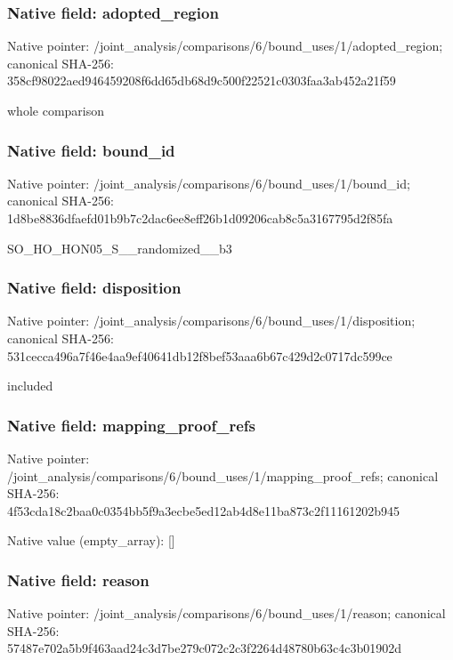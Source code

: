 \documentclass[10pt,a4paper]{article}
\begin{document}
\subsubsection{Native field: adopted\_\allowbreak{}region}
Native pointer: /joint\_\allowbreak{}analysis/comparisons/6/bound\_\allowbreak{}uses/1/adopted\_\allowbreak{}region; canonical SHA-256: 358cf98022aed946459208f6dd65db68d9c500f22521c0303faa3ab452a21f59

\begingroup\raggedright\sloppy whole comparison\par\endgroup

\subsubsection{Native field: bound\_\allowbreak{}id}
Native pointer: /joint\_\allowbreak{}analysis/comparisons/6/bound\_\allowbreak{}uses/1/bound\_\allowbreak{}id; canonical SHA-256: 1d8be8836dfaefd01b9b7c2dac6ee8eff26b1d09206cab8c5a3167795d2f85fa

\begingroup\raggedright\sloppy SO\_\allowbreak{}HO\_\allowbreak{}HON05\_\allowbreak{}S\_\allowbreak{}\_\allowbreak{}randomized\_\allowbreak{}\_\allowbreak{}b3\par\endgroup

\subsubsection{Native field: disposition}
Native pointer: /joint\_\allowbreak{}analysis/comparisons/6/bound\_\allowbreak{}uses/1/disposition; canonical SHA-256: 531cecca496a7f46e4aa9ef40641db12f8bef53aaa6b67c429d2c0717dc599ce

\begingroup\raggedright\sloppy included\par\endgroup

\subsubsection{Native field: mapping\_\allowbreak{}proof\_\allowbreak{}refs}
Native pointer: /joint\_\allowbreak{}analysis/comparisons/6/bound\_\allowbreak{}uses/1/mapping\_\allowbreak{}proof\_\allowbreak{}refs; canonical SHA-256: 4f53cda18c2baa0c0354bb5f9a3ecbe5ed12ab4d8e11ba873c2f11161202b945

Native value (empty\_\allowbreak{}array): []

\subsubsection{Native field: reason}
Native pointer: /joint\_\allowbreak{}analysis/comparisons/6/bound\_\allowbreak{}uses/1/reason; canonical SHA-256: 57487e702a5b9f463aad24c3d7be279c072c2c3f2264d48780b63c4c3b01902d
\end{document}
